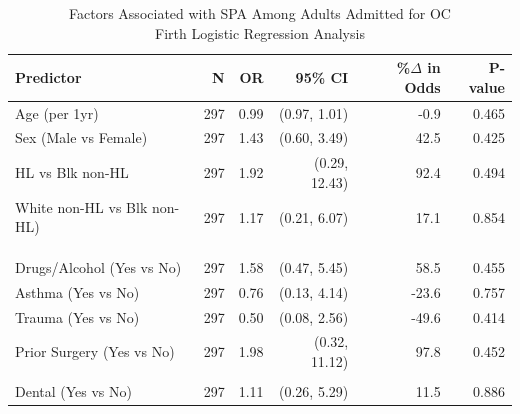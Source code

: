 \documentclass[
]{article}
\begin{document}
\begin{table}[t]
\caption*{
{\fontsize{20}{25}\selectfont  Factors Associated with SPA Among Adults Admitted for OC\small } \\ 
{\fontsize{14}{17}\selectfont  Firth Logistic Regression Analysis\small }
} 
\begin{tabular*}{0.85\linewidth}{@{\extracolsep{\fill}}lrrrrr}
\toprule
{\bfseries Predictor} & N & OR & 95\% CI & \%\ensuremath{\Delta} in Odds & P-value \\ 
\midrule\addlinespace[2.5pt]
Age (per 1yr) & 297 & 0.99 & (0.97, 1.01) & -0.9 & 0.465 \\ 
Sex (Male vs Female) & 297 & 1.43 & (0.60, 3.49) & 42.5 & 0.425 \\ 
HL vs Blk non-HL & 297 & 1.92 & (0.29, 12.43) & 92.4 & 0.494 \\ 
White non-HL vs Blk non-HL) & 297 & 1.17 & (0.21, 6.07) & 17.1 & 0.854 \\ 
{\cellcolor[HTML]{FFF3CD}{Sinusitis (Yes vs No)}} & {\cellcolor[HTML]{FFF3CD}{297}} & {\cellcolor[HTML]{FFF3CD}{8.17}} & {\cellcolor[HTML]{FFF3CD}{(2.78, 29.59)}} & {\cellcolor[HTML]{FFF3CD}{716.7}} & {\cellcolor[HTML]{FFF3CD}{<0.001}} \\ 
{\cellcolor[HTML]{FFF3CD}{Diabetes (Yes vs No)}} & {\cellcolor[HTML]{FFF3CD}{297}} & {\cellcolor[HTML]{FFF3CD}{0.21}} & {\cellcolor[HTML]{FFF3CD}{(0.06, 0.65)}} & {\cellcolor[HTML]{FFF3CD}{-78.6}} & {\cellcolor[HTML]{FFF3CD}{0.005}} \\ 
{\cellcolor[HTML]{FFF3CD}{Immuno (Yes vs No)}} & {\cellcolor[HTML]{FFF3CD}{297}} & {\cellcolor[HTML]{FFF3CD}{0.24}} & {\cellcolor[HTML]{FFF3CD}{(0.06, 0.77)}} & {\cellcolor[HTML]{FFF3CD}{-75.7}} & {\cellcolor[HTML]{FFF3CD}{0.015}} \\ 
Drugs/Alcohol (Yes vs No) & 297 & 1.58 & (0.47, 5.45) & 58.5 & 0.455 \\ 
Asthma (Yes vs No) & 297 & 0.76 & (0.13, 4.14) & -23.6 & 0.757 \\ 
Trauma (Yes vs No) & 297 & 0.50 & (0.08, 2.56) & -49.6 & 0.414 \\ 
Prior Surgery (Yes vs No) & 297 & 1.98 & (0.32, 11.12) & 97.8 & 0.452 \\ 
{\cellcolor[HTML]{FFF3CD}{Surgery in Admission (Yes vs No)}} & {\cellcolor[HTML]{FFF3CD}{297}} & {\cellcolor[HTML]{FFF3CD}{37.41}} & {\cellcolor[HTML]{FFF3CD}{(11.79, 187.95)}} & {\cellcolor[HTML]{FFF3CD}{3,641.3}} & {\cellcolor[HTML]{FFF3CD}{<0.001}} \\ 
Dental (Yes vs No) & 297 & 1.11 & (0.26, 5.29) & 11.5 & 0.886 \\ 

\end{tabular*}
\end{table}
\end{document}
